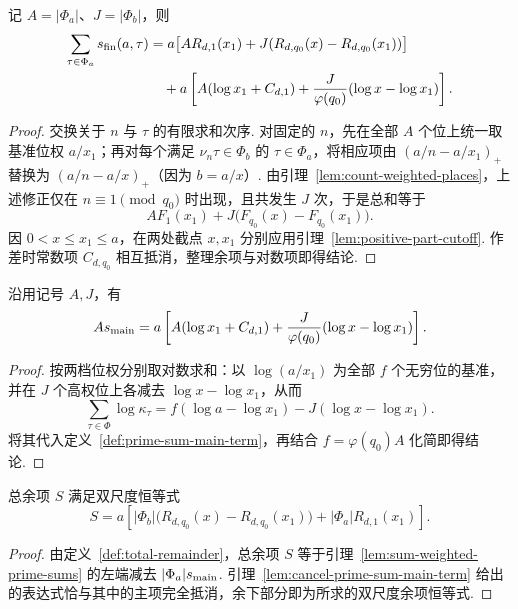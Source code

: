 \begin{lemma}[$a$-位上的带权素数和]
\label{lem:sum-weighted-prime-sums}
\emitthmsource
记 $A=|\Phi_a|$、$J=|\Phi_b|$，则
\[
\begin{aligned}
 \sum_{\tau\in\Phi_a}s_{\rm fin}(a,\tau)
 &=a\bigl[A R_{d,1}(x_1)+J(R_{d,q_0}(x)-R_{d,q_0}(x_1))\bigr]\\
 &\quad+a\left[A(\log x_1+C_{d,1})
           +\frac{J}{\varphi(q_0)}(\log x-\log x_1)\right].
\end{aligned}
\]
\end{lemma}
\begin{proof}
交换关于 $n$ 与 $\tau$ 的有限求和次序. 对固定的 $n$，先在全部 $A$ 个位上统一取基准位权 $a/x_1$；再对每个满足 $\nu_n\tau\in\Phi_b$ 的 $\tau\in\Phi_a$，将相应项由 $(a/n-a/x_1)_+$ 替换为 $(a/n-a/x)_+$（因为 $b=a/x$）. 由引理~\ref{lem:count-weighted-places}，上述修正仅在 $n\equiv1\pmod{q_0}$ 时出现，且共发生 $J$ 次，于是总和等于
\[
 A F_1(x_1)+J\bigl(F_{q_0}(x)-F_{q_0}(x_1)\bigr).
\]
因 $0<x\le x_1\le a$，在两处截点 $x,x_1$ 分别应用引理~\ref{lem:positive-part-cutoff}. 作差时常数项 $C_{d,q_0}$ 相互抵消，整理余项与对数项即得结论.
\end{proof}

\begin{lemma}[平均主项的计算]
\label{lem:cancel-prime-sum-main-term}
\emitthmsource
沿用记号 $A,J$，有
\[
 A s_{\rm main}=a\left[A(\log x_1+C_{d,1})
                    +\frac{J}{\varphi(q_0)}(\log x-\log x_1)\right].
\]
\end{lemma}
\begin{proof}
按两档位权分别取对数求和：以 $\log(a/x_1)$ 为全部 $f$ 个无穷位的基准，并在 $J$ 个高权位上各减去 $\log x-\log x_1$，从而
\[
 \sum_{\tau\in\Phi}\log\kappa_\tau
 =f(\log a-\log x_1)-J(\log x-\log x_1).
\]
将其代入定义~\ref{def:prime-sum-main-term}，再结合 $f=\varphi(q_0)A$ 化简即得结论.
\end{proof}

\begin{lemma}[双尺度余项恒等式]
\label{lem:remainder}
\emitthmsource
总余项 $S$ 满足双尺度恒等式
\begin{equation}
 S=a\left[|\Phi_b|\bigl(R_{d,q_0}(x)-R_{d,q_0}(x_1)\bigr)
                  +|\Phi_a|R_{d,1}(x_1)\right].
\label{eq:ch1-remainder-eq}
\end{equation}
\end{lemma}
\begin{proof}
由定义~\ref{def:total-remainder}，总余项 $S$ 等于引理~\ref{lem:sum-weighted-prime-sums} 的左端减去 $|\Phi_a|s_{\rm main}$. 引理~\ref{lem:cancel-prime-sum-main-term} 给出的表达式恰与其中的主项完全抵消，余下部分即为所求的双尺度余项恒等式.
\end{proof}

